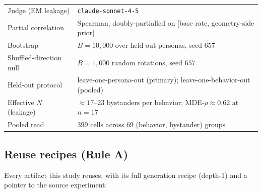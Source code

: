 \documentclass[11pt]{article}
\begin{document}
\begin{center}
\begin{tabular}{ll}
Judge (EM leakage) & \texttt{claude-sonnet-4-5} \\
Partial correlation & Spearman, doubly-partialled on [base rate, geometry-side prior] \\
Bootstrap & $B{=}10{,}000$ over held-out personas, seed $657$ \\
Shuffled-direction null & $B{=}1{,}000$ random rotations, seed $657$ \\
Held-out protocol & leave-one-persona-out (primary); leave-one-behavior-out (pooled) \\
Effective $N$ (leakage) & $\approx 17$--$23$ bystanders per behavior; MDE-$\rho \approx 0.62$ at $n{=}17$ \\
Pooled read & $399$ cells across $69$ (behavior, bystander) groups \\
\bottomrule
\end{tabular}
\end{center}

\subsection{Reuse recipes (Rule A)}
\label{app:reuse}

Every artifact this study reuses, with its full generation recipe (depth-1) and a
pointer to the source experiment:
\end{document}
